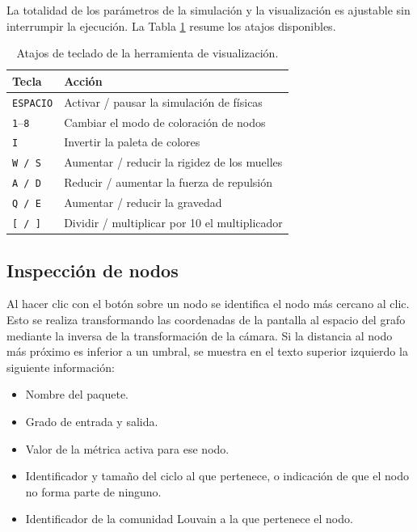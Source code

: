 \documentclass[12pt,a4paper]{report}
\begin{document}
	La totalidad de los parámetros de la simulación y la visualización es ajustable sin interrumpir la ejecución. La Tabla \ref{tab:controles} resume los atajos disponibles.
	
	\begin{table}[H]
		\centering
		\caption{Atajos de teclado de la herramienta de visualización.}
		\label{tab:controles}
		\begin{tabular}{@{}ll@{}}
			\toprule
			\textbf{Tecla} & \textbf{Acción} \\
			\midrule
			\texttt{ESPACIO}       & Activar / pausar la simulación de físicas \\
			\texttt{1}--\texttt{8} & Cambiar el modo de coloración de nodos \\
			\texttt{I}             & Invertir la paleta de colores \\
			\texttt{W / S}         & Aumentar / reducir la rigidez de los muelles \\
			\texttt{A / D}         & Reducir / aumentar la fuerza de repulsión \\
			\texttt{Q / E}         & Aumentar / reducir la gravedad \\
			\texttt{[ / ]}         & Dividir / multiplicar por 10 el multiplicador\\
			\bottomrule
		\end{tabular}
	\end{table}
	
	\subsection{Inspección de nodos}
	
	Al hacer clic con el botón sobre un nodo se identifica el nodo más cercano al clic. Esto se realiza transformando las coordenadas de la pantalla al espacio del grafo mediante la inversa de la transformación de la cámara. Si la distancia al nodo más próximo es inferior a un umbral, se muestra en el texto superior izquierdo la siguiente información:
	
	\begin{itemize}
		\item Nombre del paquete.
		\item Grado de entrada y salida.
		\item Valor de la métrica activa para ese nodo.
		\item Identificador y tamaño del ciclo al que pertenece, o indicación de que el nodo no forma parte de ninguno.
		\item Identificador de la comunidad Louvain a la que pertenece el nodo.
	\end{itemize}
	
\end{document}
